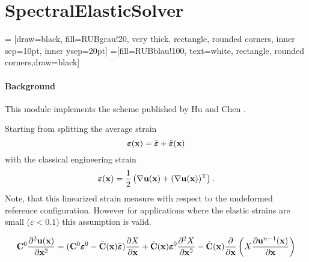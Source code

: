 \section{SpectralElasticSolver}
\label{sec:module_spectralelasticsolver}

 = [draw=black, fill=RUBgrau!20, very thick, rectangle, rounded corners, inner sep=10pt, inner ysep=20pt]
 =[fill=RUBblau!100, text=white, rectangle, rounded corners,draw=black]

\paragraph{Background} This module implements the scheme published by Hu and Chen .

Starting from splitting the average strain
\begin{equation}
  \mbox{\boldmath $\varepsilon$}(\mathbf{x}) = \bar{\mbox{\boldmath $\varepsilon$}} + \tilde{\mbox{\boldmath $\varepsilon$}}(\mathbf{x})
\end{equation}
with the classical engineering strain
\begin{equation}
  \mbox{\boldmath $\varepsilon$}(\mathbf{x}) = \frac{1}{2}\left(\nabla \mathbf{u}(\mathbf{x}) + (\nabla \mathbf{u}(\mathbf{x}))^\mathrm{T}\right).
\end{equation}
Note, that this linearized strain measure with respect to the undeformed reference configuration. However for applications where the elastic strains are small ($\varepsilon < 0.1$) this assumption is valid.

\begin{equation}
  \mathbf{C}^{0} \frac{\partial^2 \mathbf{u}(\mathbf{x})}{\partial \mathbf{x}^2} = (\mathbf{C}^{0} \mbox{\boldmath $\varepsilon$}^0 - \tilde{\mathbf{C}}(\mathbf{x}) \bar{\mbox{\boldmath $\varepsilon$}}) \frac{\partial X}{\partial \mathbf{x}} + \tilde{\mathbf{C}}(\mathbf{x})\mbox{\boldmath $\varepsilon$}^0\frac{\partial^2 X}{\partial \mathbf{x}^2} - \tilde{\mathbf{C}}(\mathbf{x}) \frac{\partial}{\partial \mathbf{x}} \left(X\frac{\partial \mathbf{u}^{n-1}(\mathbf{x})}{\partial \mathbf{x}}\right)
\end{equation}
